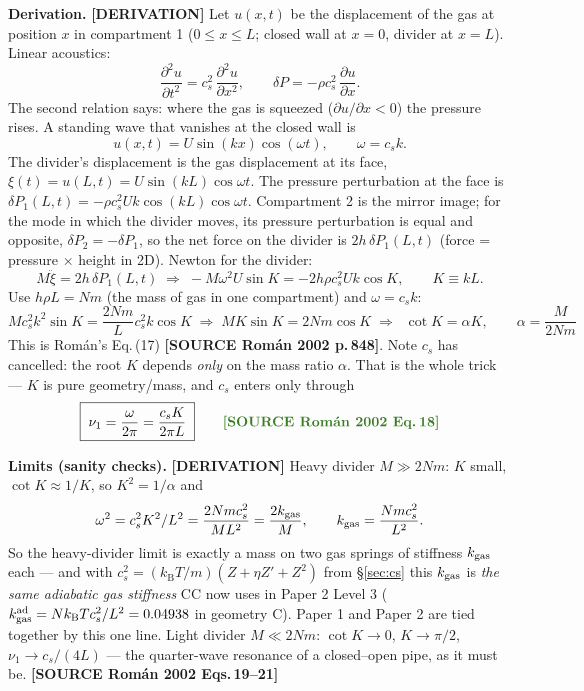 \documentclass[11pt,a4paper]{article}
\newcommand{\kT}{k_{\mathrm B}T}
\newcommand{\src}[1]{\textcolor{OliveGreen}{\textbf{[SOURCE #1]}}}
\newcommand{\der}{\textcolor{NavyBlue}{\textbf{[DERIVATION]}}}
\begin{document}
\textbf{Derivation.} \der{} Let $u(x,t)$ be the displacement of the gas at position $x$ in compartment 1 ($0 \le x \le L$; closed wall at $x=0$, divider at $x=L$). Linear acoustics:
\begin{equation}
\frac{\partial^2 u}{\partial t^2} = c_s^2\,\frac{\partial^2 u}{\partial x^2},
\qquad
\delta P = -\rho c_s^2\,\frac{\partial u}{\partial x}.
\label{eq:wave}
\end{equation}
The second relation says: where the gas is squeezed ($\partial u/\partial x<0$) the pressure rises. A standing wave that vanishes at the closed wall is
\begin{equation}
u(x,t) = U\sin(kx)\cos(\omega t), \qquad \omega = c_s k .
\label{eq:standing}
\end{equation}
The divider's displacement is the gas displacement at its face, $\xi(t) = u(L,t) = U \sin(kL)\cos\omega t$. The pressure perturbation at the face is $\delta P_1(L,t) = -\rho c_s^2 U k\cos(kL)\cos\omega t$. Compartment 2 is the mirror image; for the mode in which the divider moves, its pressure perturbation is equal and opposite, $\delta P_2 = -\delta P_1$, so the net force on the divider is $2h\,\delta P_1(L,t)$ (force = pressure $\times$ height in 2D). Newton for the divider:
\begin{equation}
M\ddot\xi = 2h\,\delta P_1(L,t)
\;\Longrightarrow\;
-M\omega^2 U\sin K = -2h\rho c_s^2 U k \cos K, \qquad K \equiv kL .
\end{equation}
Use $h\rho L = Nm$ (the mass of gas in one compartment) and $\omega = c_s k$:
\begin{equation}
M c_s^2 k^2 \sin K = \frac{2Nm}{L} c_s^2 k \cos K
\;\Longrightarrow\;
M K \sin K = 2Nm \cos K
\;\Longrightarrow\;
\boxed{\;\cot K = \alpha K,\qquad \alpha = \frac{M}{2Nm}\;}
\label{eq:cotK}
\end{equation}
This is Rom\'an's Eq.\,(17) \src{Rom\'an 2002 p.\,848}. Note $c_s$ has cancelled: the root $K$ depends \emph{only} on the mass ratio $\alpha$. That is the whole trick --- $K$ is pure geometry/mass, and $c_s$ enters only through
\begin{equation}
\boxed{\;\nu_1 = \frac{\omega}{2\pi} = \frac{c_s K}{2\pi L}\;}
\qquad\text{\src{Rom\'an 2002 Eq.\,18}}
\label{eq:nu}
\end{equation}

\textbf{Limits (sanity checks).} \der{} Heavy divider $M \gg 2Nm$: $K$ small, $\cot K \approx 1/K$, so $K^2 = 1/\alpha$ and
\begin{equation}
\omega^2 = c_s^2 K^2/L^2 = \frac{2 N m c_s^2}{M L^2} = \frac{2 k_{\rm gas}}{M},
\qquad k_{\rm gas} = \frac{N m c_s^2}{L^2}.
\label{eq:kgas}
\end{equation}
So the heavy-divider limit is exactly a mass on two gas springs of stiffness $k_{\rm gas}$ each --- and with $c_s^2 = (\kT/m)(Z+\eta Z'+Z^2)$ from \S\ref{sec:cs} this $k_{\rm gas}$ is \emph{the same adiabatic gas stiffness} CC now uses in Paper 2 Level 3 ($k_{\rm gas}^{\rm ad} = N\kT c_s^2/L^2 = 0.04938$ in geometry C). Paper 1 and Paper 2 are tied together by this one line. Light divider $M \ll 2Nm$: $\cot K \to 0$, $K \to \pi/2$, $\nu_1 \to c_s/(4L)$ --- the quarter-wave resonance of a closed--open pipe, as it must be. \src{Rom\'an 2002 Eqs.\,19--21}
\end{document}
